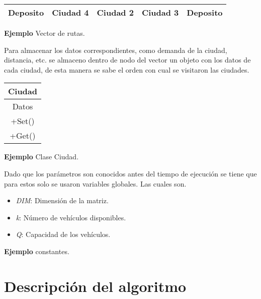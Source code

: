 \documentclass[letter, 10pt]{article}
\begin{document}
\begin{center}
 \begin{tabular}[t]{|c|c|c|c|c|}
\hline
 Deposito & Ciudad 4 & Ciudad 2 & Ciudad 3 & Deposito \\
\hline

\end{tabular}
\end{center}
\begin{center}
\textbf{Ejemplo} Vector de rutas. 
\end{center}

Para almacenar los datos correspondientes, como demanda de la ciudad, distancia, etc. se almaceno dentro de nodo del vector un objeto con los datos de cada ciudad, de esta manera se sabe el orden 
con cual se visitaron las ciudades.
\begin{center}
 \begin{tabular}[t]{|c|}
\hline

 Ciudad \\
 \hline
Datos \\
\hline
+Set() \\
+Get() \\
\hline
 \end{tabular}
\end{center}

\begin{center}
\textbf{Ejemplo} Clase Ciudad. 
\end{center}

Dado que los par\'ametros son conocidos antes del tiempo de ejecuci\'on se tiene que para estos solo se usaron variables globales. Las cuales son.
\begin{center}
 \begin{itemize}
 \item \emph{DIM}: Dimensi\'on de la matriz.
 \item \emph{k}: N\'umero de veh\'iculos disponibles.
 \item \emph{Q}: Capacidad de los veh\'iculos.
 \end{itemize}
\end{center}
\begin{center}
\textbf{Ejemplo} constantes. 
\end{center}




\newpage

\section{Descripci\'on del algoritmo}
\end{document}
